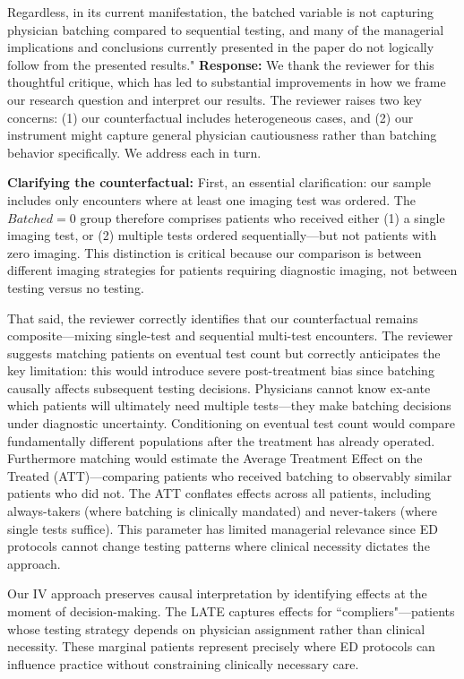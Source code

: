 \documentclass[11pt]{article}
\newenvironment{quote2}
{ \bigskip
\noindent
         \small\em
         \baselineskip=14pt
}
\newcommand{\1}{\hbox{\rm 1\kern-.35em 1}}
\begin{document}
{\begin{quote2}
Regardless, in its current manifestation, the batched variable is not capturing physician batching compared to sequential testing, and many of the managerial implications and conclusions currently presented in the paper do not logically follow from the presented results."
\end{quote2}

\noindent\textbf{Response:} \color{blue}We thank the reviewer for this thoughtful critique, which has led to substantial improvements in how we frame our research question and interpret our results. The reviewer raises two key concerns: (1) our counterfactual includes heterogeneous cases, and (2) our instrument might capture general physician cautiousness rather than batching behavior specifically. We address each in turn.

\textbf{Clarifying the counterfactual:} First, an essential clarification: our sample includes only encounters where at least one imaging test was ordered. The $Batched=0$ group therefore comprises patients who received either (1) a single imaging test, or (2) multiple tests ordered sequentially—but not patients with zero imaging. This distinction is critical because our comparison is between different imaging strategies for patients requiring diagnostic imaging, not between testing versus no testing.

That said, the reviewer correctly identifies that our counterfactual remains composite—mixing single-test and sequential multi-test encounters. The reviewer suggests matching patients on eventual test count but correctly anticipates the key limitation: this would introduce severe post-treatment bias since batching causally affects subsequent testing decisions. Physicians cannot know ex-ante which patients will ultimately need multiple tests—they make batching decisions under diagnostic uncertainty. Conditioning on eventual test count would compare fundamentally different populations after the treatment has already operated. Furthermore matching would estimate the Average Treatment Effect on the Treated (ATT)---comparing patients who received batching to observably similar patients who did not. The ATT conflates effects across all patients, including always-takers (where batching is clinically mandated) and never-takers (where single tests suffice). This parameter has limited managerial relevance since ED protocols cannot change testing patterns where clinical necessity dictates the approach.

Our IV approach preserves causal interpretation by identifying effects at the moment of decision-making. The LATE captures effects for ``compliers"—patients whose testing strategy depends on physician assignment rather than clinical necessity. These marginal patients represent precisely where ED protocols can influence practice without constraining clinically necessary care.

}
\end{document}
